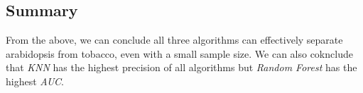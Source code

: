 \documentclass[9pt,technote]{IEEEtran}
\begin{document}
\subsection{Summary}
From the above, we can conclude all three algorithms can effectively separate arabidopsis from tobacco, even with a small sample size. We can also coknclude that \textit{KNN} has the highest precision of all algorithms but \textit{Random Forest} has the highest \textit{AUC}.

 

\end{document}

